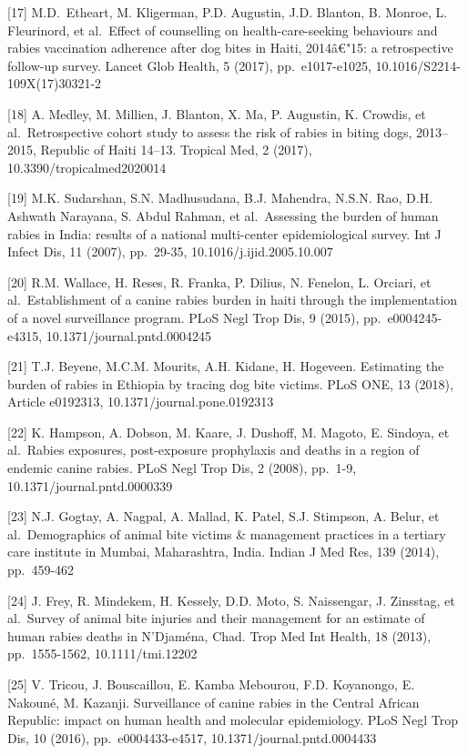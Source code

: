 \documentclass[
]{book}
\begin{document}
{[}17{]} M.D.~Etheart, M. Kligerman, P.D. Augustin, J.D. Blanton, B. Monroe, L. Fleurinord, et al.~Effect of counselling on health-care-seeking behaviours and rabies vaccination adherence after dog bites in Haiti, 2014â€"15: a retrospective follow-up survey. Lancet Glob Health, 5 (2017), pp.~e1017-e1025, 10.1016/S2214-109X(17)30321-2

{[}18{]} A. Medley, M. Millien, J. Blanton, X. Ma, P. Augustin, K. Crowdis, et al.~Retrospective cohort study to assess the risk of rabies in biting dogs, 2013--2015, Republic of Haiti 14--13. Tropical Med, 2 (2017), 10.3390/tropicalmed2020014

{[}19{]} M.K. Sudarshan, S.N. Madhusudana, B.J. Mahendra, N.S.N. Rao, D.H. Ashwath Narayana, S. Abdul Rahman, et al.~Assessing the burden of human rabies in India: results of a national multi-center epidemiological survey. Int J Infect Dis, 11 (2007), pp.~29-35, 10.1016/j.ijid.2005.10.007

{[}20{]} R.M. Wallace, H. Reses, R. Franka, P. Dilius, N. Fenelon, L. Orciari, et al.~Establishment of a canine rabies burden in haiti through the implementation of a novel surveillance program. PLoS Negl Trop Dis, 9 (2015), pp.~e0004245-e4315, 10.1371/journal.pntd.0004245

{[}21{]} T.J. Beyene, M.C.M. Mourits, A.H. Kidane, H. Hogeveen. Estimating the burden of rabies in Ethiopia by tracing dog bite victims. PLoS ONE, 13 (2018), Article e0192313, 10.1371/journal.pone.0192313

{[}22{]} K. Hampson, A. Dobson, M. Kaare, J. Dushoff, M. Magoto, E. Sindoya, et al.~Rabies exposures, post-exposure prophylaxis and deaths in a region of endemic canine rabies. PLoS Negl Trop Dis, 2 (2008), pp.~1-9, 10.1371/journal.pntd.0000339

{[}23{]} N.J. Gogtay, A. Nagpal, A. Mallad, K. Patel, S.J. Stimpson, A. Belur, et al.~Demographics of animal bite victims \& management practices in a tertiary care institute in Mumbai, Maharashtra, India. Indian J Med Res, 139 (2014), pp.~459-462

{[}24{]} J. Frey, R. Mindekem, H. Kessely, D.D. Moto, S. Naissengar, J. Zinsstag, et al.~Survey of animal bite injuries and their management for an estimate of human rabies deaths in N'Djaména, Chad. Trop Med Int Health, 18 (2013), pp.~1555-1562, 10.1111/tmi.12202

{[}25{]} V. Tricou, J. Bouscaillou, E. Kamba Mebourou, F.D. Koyanongo, E. Nakouné, M. Kazanji. Surveillance of canine rabies in the Central African Republic: impact on human health and molecular epidemiology. PLoS Negl Trop Dis, 10 (2016), pp.~e0004433-e4517, 10.1371/journal.pntd.0004433
\end{document}
